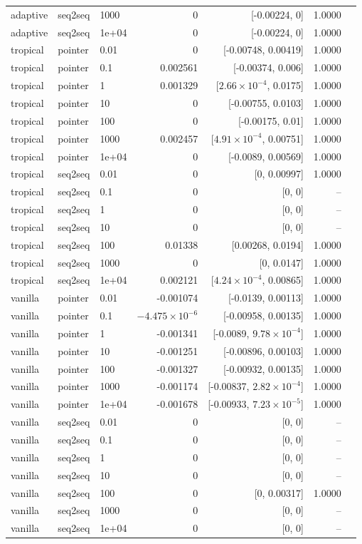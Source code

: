 \documentclass[10pt]{article}
\begin{document}
{\begin{longtable}{lllrrrl}
adaptive & seq2seq & 1000 & 0 & [-0.00224, 0] & 1.0000 & \\
adaptive & seq2seq & 1e+04 & 0 & [-0.00224, 0] & 1.0000 & \\
tropical & pointer & 0.01 & 0 & [-0.00748, 0.00419] & 1.0000 & \\
tropical & pointer & 0.1 & 0.002561 & [-0.00374, 0.006] & 1.0000 & \\
tropical & pointer & 1 & 0.001329 & [$2.66\times10^{-4}$, 0.0175] & 1.0000 & \\
tropical & pointer & 10 & 0 & [-0.00755, 0.0103] & 1.0000 & \\
tropical & pointer & 100 & 0 & [-0.00175, 0.01] & 1.0000 & \\
tropical & pointer & 1000 & 0.002457 & [$4.91\times10^{-4}$, 0.00751] & 1.0000 & \\
tropical & pointer & 1e+04 & 0 & [-0.0089, 0.00569] & 1.0000 & \\
tropical & seq2seq & 0.01 & 0 & [0, 0.00997] & 1.0000 & \\
tropical & seq2seq & 0.1 & 0 & [0, 0] & -- & \\
tropical & seq2seq & 1 & 0 & [0, 0] & -- & \\
tropical & seq2seq & 10 & 0 & [0, 0] & -- & \\
tropical & seq2seq & 100 & 0.01338 & [0.00268, 0.0194] & 1.0000 & \\
tropical & seq2seq & 1000 & 0 & [0, 0.0147] & 1.0000 & \\
tropical & seq2seq & 1e+04 & 0.002121 & [$4.24\times10^{-4}$, 0.00865] & 1.0000 & \\
vanilla & pointer & 0.01 & -0.001074 & [-0.0139, 0.00113] & 1.0000 & \\
vanilla & pointer & 0.1 & $-4.475\times10^{-6}$ & [-0.00958, 0.00135] & 1.0000 & \\
vanilla & pointer & 1 & -0.001341 & [-0.0089, $9.78\times10^{-4}$] & 1.0000 & \\
vanilla & pointer & 10 & -0.001251 & [-0.00896, 0.00103] & 1.0000 & \\
vanilla & pointer & 100 & -0.001327 & [-0.00932, 0.00135] & 1.0000 & \\
vanilla & pointer & 1000 & -0.001174 & [-0.00837, $2.82\times10^{-4}$] & 1.0000 & \\
vanilla & pointer & 1e+04 & -0.001678 & [-0.00933, $7.23\times10^{-5}$] & 1.0000 & \\
vanilla & seq2seq & 0.01 & 0 & [0, 0] & -- & \\
vanilla & seq2seq & 0.1 & 0 & [0, 0] & -- & \\
vanilla & seq2seq & 1 & 0 & [0, 0] & -- & \\
vanilla & seq2seq & 10 & 0 & [0, 0] & -- & \\
vanilla & seq2seq & 100 & 0 & [0, 0.00317] & 1.0000 & \\
vanilla & seq2seq & 1000 & 0 & [0, 0] & -- & \\
vanilla & seq2seq & 1e+04 & 0 & [0, 0] & -- & \\
\bottomrule
\end{longtable}
}
\end{document}

